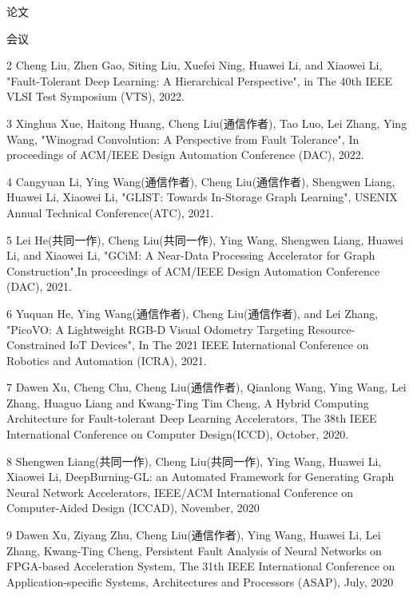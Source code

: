 \documentclass{resume} %
\begin{document}
\begin{rSection}{论文}
\begin{rSubsection} {会议}{}{}{}
    \item 2 Cheng Liu, Zhen Gao, Siting Liu, Xuefei Ning, Huawei Li, and Xiaowei Li, "Fault-Tolerant Deep Learning: A Hierarchical Perspective", in The 40th IEEE VLSI Test Symposium (VTS), 2022.

    \item 3 Xinghua Xue, Haitong Huang, Cheng Liu(通信作者), Tao Luo, Lei Zhang, Ying Wang, "Winograd Convolution: A Perspective from Fault Tolerance", In proceedings of ACM/IEEE Design Automation Conference (DAC), 2022.

    \item 4 Cangyuan Li, Ying Wang(通信作者), Cheng Liu(通信作者), Shengwen Liang, Huawei Li, Xiaowei Li, "GLIST: Towards In-Storage Graph Learning", USENIX Annual Technical Conference(ATC), 2021.

    \item 5 Lei He(共同一作), Cheng Liu(共同一作), Ying Wang, Shengwen Liang, Huawei Li, and Xiaowei Li, "GCiM: A Near-Data Processing Accelerator for Graph Construction",In proceedings of ACM/IEEE Design Automation Conference (DAC), 2021.

    \item 6 Yuquan He, Ying Wang(通信作者), Cheng Liu(通信作者), and Lei Zhang, "PicoVO: A Lightweight RGB-D Visual Odometry Targeting Resource-Constrained IoT Devices", In The 2021 IEEE International Conference on Robotics and Automation (ICRA), 2021.

    \item 7 Dawen Xu, Cheng Chu, Cheng Liu(通信作者), Qianlong Wang, Ying Wang, Lei Zhang, Huaguo Liang and Kwang-Ting Tim Cheng, A Hybrid Computing Architecture for Fault-tolerant Deep Learning Accelerators, The 38th IEEE International Conference on Computer Design(ICCD), October, 2020.

    \item 8 Shengwen Liang(共同一作), Cheng Liu(共同一作), Ying Wang, Huawei Li, Xiaowei Li, DeepBurning-GL: an Automated Framework for Generating Graph Neural Network Accelerators, IEEE/ACM International Conference on Computer-Aided Design (ICCAD), November, 2020

    \item 9 Dawen Xu, Ziyang Zhu, Cheng Liu(通信作者), Ying Wang, Huawei Li, Lei Zhang, Kwang-Ting Cheng, Persistent Fault Analysis of Neural Networks on FPGA-based Acceleration System, The 31th IEEE International Conference on Application-specific Systems, Architectures and Processors (ASAP), July, 2020


\end{rSubsection}
\end{rSection}
\end{document}
